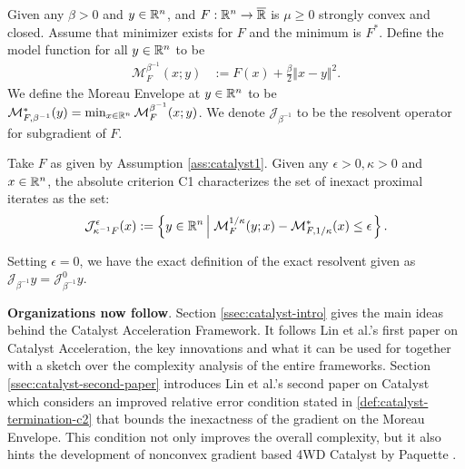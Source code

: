 \documentclass[12pt]{article}
\begin{document}
    \begin{assumption}\label{ass:catalyst1}
        Given any $\beta > 0$ and $y \in \mathbb R^n$, and $F: \mathbb R^n\rightarrow \overline {\mathbb R}$ is $\mu \ge 0$ strongly convex and closed. 
        Assume that minimizer exists for $F$ and the minimum is $F^*$. 
        Define the model function for all $y\in \mathbb R^n$ to be 
        \begin{align*}
            \mathcal M^{\beta^{-1}}_F(x; y) &:= 
            F(x) + \frac{\beta}{2}\Vert x - y\Vert^2.
        \end{align*}
        We define the Moreau Envelope at $y \in \mathbb R^n$ to be $\mathcal M^*_{F,\beta^{-1}}(y) = \min_{x\in \mathbb R^n} \mathcal M_F^{\beta^{-1}}(x; y)$. 
        We denote $\mathcal J_{\beta^{-1}}$ to be the resolvent operator for subgradient of $F$. 
    \end{assumption}
    \begin{definition}\label{def:catalyst-termination-c1}
        Take $F$ as given by Assumption \ref{ass:catalyst1}.
        Given any $\epsilon > 0, \kappa > 0$ and $x \in \mathbb R^n$, the absolute criterion C1 characterizes the set of inexact proximal iterates as the set: 
        \begin{align*}
            \mathcal J_{\kappa^{-1} F}^\epsilon (x) := 
            \left\lbrace
                y \in \mathbb R^n \left | \; 
                        \mathcal M^{1/\kappa}_F (y; x) - 
                        \mathcal M^*_{F, 1/\kappa}(x) \le \epsilon
                \right.
            \right\rbrace. 
        \end{align*}
    \end{definition}
    \begin{remark}
        Setting $\epsilon = 0$, we have the exact definition of the exact resolvent given as $\mathcal J_{\beta^{-1}}y = \mathcal J^0_{\beta^{-1}}y$. 
    \end{remark}
    \textbf{Organizations now follow}. 
    Section \ref{ssec:catalyst-intro} gives the main ideas behind the Catalyst Acceleration Framework. 
    It follows Lin et al.'s first paper \cite{lin_universal_2015} on Catalyst Acceleration, the key innovations and what it can be used for together with a sketch over the complexity analysis of the entire frameworks. 
    Section \ref{ssec:catalyst-second-paper} introduces Lin et al.'s second paper \cite{lin_catalyst_2018} on Catalyst which considers an improved relative error condition stated in \ref{def:catalyst-termination-c2} that bounds the inexactness of the gradient on the Moreau Envelope. 
    This condition not only improves the overall complexity, but it also hints the development of nonconvex gradient based 4WD Catalyst by Paquette \cite{paquette_catalyst_2018}. 
    
\end{document}

